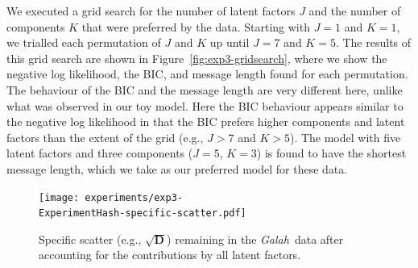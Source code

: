 \documentclass[twocolumn]{aastex62}
\newcommand{\project}[1]{\textsl{#1}}
\newcommand{\Galah}{\project{Galah}}
\newcommand{\vect}[1]{\boldsymbol{\mathbf{#1}}}
\renewcommand{\vec}[1]{\vect{#1}}
\newcommand{\specificvariance}{\vec{D}}
\newcommand{\NumLatentFactors}{J}
\newcommand{\NumComponents}{K}
\newcommand{\ExperimentHash}{89dab}
\begin{document}

We executed a grid search for the number of latent factors $\NumLatentFactors$
and the number of components $\NumComponents$ that were preferred by the data.
Starting with $\NumLatentFactors = 1$ and $\NumComponents = 1$, we trialled each
permutation of $\NumLatentFactors$ and $\NumComponents$ up until $\NumLatentFactors = 7$
and $\NumComponents = 5$. 
The results of this grid search are shown in Figure~\ref{fig:exp3-gridsearch},
where we show the negative log likelihood, the BIC, and message length found for each permutation.
The behaviour of the BIC and the message length are very different here, unlike what was observed
in our toy model. Here the BIC behaviour appears similar to the negative log likelihood in that the BIC
prefers higher components and latent factors than the extent of the grid (e.g., $J > 7$ and $K > 5$).
The model with five latent factors and three components ($J = 5$, $K = 3$) is found to have the shortest message length, which we take as our preferred model for these data.



\begin{figure}
	\texttt{[image: experiments/exp3-\\ExperimentHash-specific-scatter.pdf]}
	\caption{Specific scatter (e.g., $\sqrt{\specificvariance}$) remaining in the \Galah\ data \citep{Buder:2018}
			 after accounting for the contributions by all
			 latent factors.}
    \label{fig:exp3-specific-scatter}
\end{figure}
\end{document}
